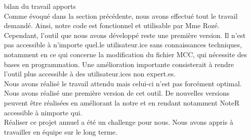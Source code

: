 bilan du travail
apports
\\
Comme évoqué dans la section précédente, nous avons effectué tout le travail demandé.
Ainsi, notre code est fonctionnel et utilisable par Mme Rozé. 
\\
Cependant, l'outil que nous avons développé reste une première version.
Il n’est pas accessible à n’importe quel.le utilisateur.ice sans connaissances techniques, notamment en ce qui concerne la modification du fichier MCC, qui nécessite des bases en programmation. 
Une amélioration importante consisterait à rendre l’outil plus accessible à des utilisateur.ices non expert.es.
\\
Nous avons réalisé le travail attendu mais celui-ci n'est pas forcément optimal. Nous avons 
réalisé une première version de cet outil. De nouvelles versions peuvent être réalisées
 en améliorant la notre et en rendant notamment NoteR accessible à nimporte qui.
\\
Réaliser ce projet annuel a été un challenge pour nous. Nous avons appris à travailler en équipe sur le long terme.
